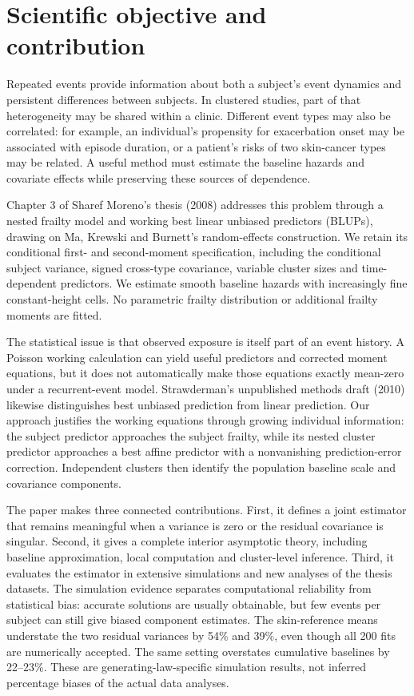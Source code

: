 \documentclass[11pt]{article}
\begin{document}
\vspace{0.6em}

\section{Scientific objective and contribution}\label{sec:1}

Repeated events provide information about both a subject's event dynamics and persistent differences between subjects. In clustered studies, part of that heterogeneity may be shared within a clinic. Different event types may also be correlated: for example, an individual's propensity for exacerbation onset may be associated with episode duration, or a patient's risks of two skin-cancer types may be related. A useful method must estimate the baseline hazards and covariate effects while preserving these sources of dependence.

Chapter 3 of Sharef Moreno's thesis (2008) addresses this problem through a nested frailty model and working best linear unbiased predictors (BLUPs), drawing on Ma, Krewski and Burnett's random-effects construction. We retain its conditional first- and second-moment specification, including the conditional subject variance, signed cross-type covariance, variable cluster sizes and time-dependent predictors. We estimate smooth baseline hazards with increasingly fine constant-height cells. No parametric frailty distribution or additional frailty moments are fitted.

The statistical issue is that observed exposure is itself part of an event history. A Poisson working calculation can yield useful predictors and corrected moment equations, but it does not automatically make those equations exactly mean-zero under a recurrent-event model. Strawderman's unpublished methods draft (2010) likewise distinguishes best unbiased prediction from linear prediction. Our approach justifies the working equations through growing individual information: the subject predictor approaches the subject frailty, while its nested cluster predictor approaches a best affine predictor with a nonvanishing prediction-error correction. Independent clusters then identify the population baseline scale and covariance components.

The paper makes three connected contributions. First, it defines a joint estimator that remains meaningful when a variance is zero or the residual covariance is singular. Second, it gives a complete interior asymptotic theory, including baseline approximation, local computation and cluster-level inference. Third, it evaluates the estimator in extensive simulations and new analyses of the thesis datasets. The simulation evidence separates computational reliability from statistical bias: accurate solutions are usually obtainable, but few events per subject can still give biased component estimates. The skin-reference means understate the two residual variances by 54\% and 39\%, even though all 200 fits are numerically accepted. The same setting overstates cumulative baselines by 22--23\%. These are generating-law-specific simulation results, not inferred percentage biases of the actual data analyses.
\end{document}
